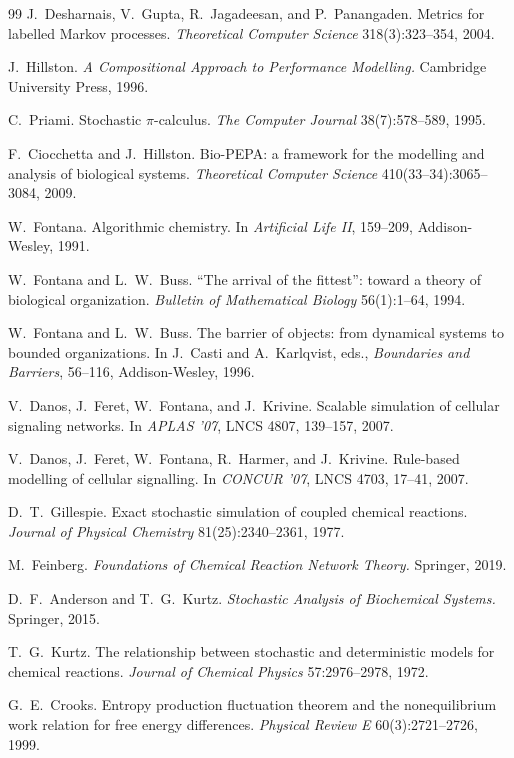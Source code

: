 \documentclass[11pt]{article}
\theoremstyle{plain}
\theoremstyle{definition}
\theoremstyle{remark}
\begin{document}
\begin{thebibliography}{99}
J.~Desharnais, V.~Gupta, R.~Jagadeesan, and P.~Panangaden. Metrics for labelled Markov processes. \emph{Theoretical Computer Science} 318(3):323--354, 2004.

J.~Hillston. \emph{A Compositional Approach to Performance Modelling.} Cambridge University Press, 1996.

C.~Priami. Stochastic $\pi$-calculus. \emph{The Computer Journal} 38(7):578--589, 1995.

F.~Ciocchetta and J.~Hillston. Bio-PEPA: a framework for the modelling and analysis of biological systems. \emph{Theoretical Computer Science} 410(33--34):3065--3084, 2009.

W.~Fontana. Algorithmic chemistry. In \emph{Artificial Life II}, 159--209, Addison-Wesley, 1991.

W.~Fontana and L.~W.~Buss. ``The arrival of the fittest'': toward a theory of biological organization. \emph{Bulletin of Mathematical Biology} 56(1):1--64, 1994.

W.~Fontana and L.~W.~Buss. The barrier of objects: from dynamical systems to bounded organizations. In J.~Casti and A.~Karlqvist, eds., \emph{Boundaries and Barriers}, 56--116, Addison-Wesley, 1996.

V.~Danos, J.~Feret, W.~Fontana, and J.~Krivine. Scalable simulation of cellular signaling networks. In \emph{APLAS '07}, LNCS 4807, 139--157, 2007.

V.~Danos, J.~Feret, W.~Fontana, R.~Harmer, and J.~Krivine. Rule-based modelling of cellular signalling. In \emph{CONCUR '07}, LNCS 4703, 17--41, 2007.

D.~T.~Gillespie. Exact stochastic simulation of coupled chemical reactions. \emph{Journal of Physical Chemistry} 81(25):2340--2361, 1977.

M.~Feinberg. \emph{Foundations of Chemical Reaction Network Theory.} Springer, 2019.

D.~F.~Anderson and T.~G.~Kurtz. \emph{Stochastic Analysis of Biochemical Systems.} Springer, 2015.

T.~G.~Kurtz. The relationship between stochastic and deterministic models for chemical reactions. \emph{Journal of Chemical Physics} 57:2976--2978, 1972.

G.~E.~Crooks. Entropy production fluctuation theorem and the nonequilibrium work relation for free energy differences. \emph{Physical Review E} 60(3):2721--2726, 1999.


\end{thebibliography}
\end{document}
